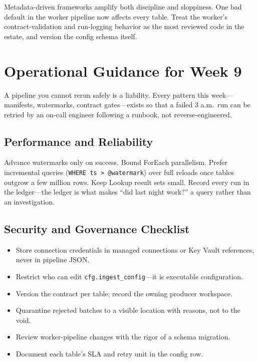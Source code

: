 \begin{pitfall}
Metadata-driven frameworks amplify both discipline and sloppiness. One bad default in the worker pipeline now affects every table. Treat the worker's contract-validation and run-logging behavior as the most reviewed code in the estate, and version the config schema itself.
\end{pitfall}

\section{Operational Guidance for Week 9}
A pipeline you cannot rerun safely is a liability. Every pattern this week---manifests, watermarks, contract gates---exists so that a failed 3 a.m.\ run can be retried by an on-call engineer following a runbook, not reverse-engineered.

\subsection{Performance and Reliability}
Advance watermarks only on success. Bound ForEach parallelism. Prefer incremental queries (\texttt{WHERE ts > @watermark}) over full reloads once tables outgrow a few million rows. Keep Lookup result sets small. Record every run in the ledger---the ledger is what makes ``did last night work?'' a query rather than an investigation.

\subsection{Security and Governance Checklist}
\begin{itemize}
    \item Store connection credentials in managed connections or Key Vault references, never in pipeline JSON.
    \item Restrict who can edit \texttt{cfg.ingest\_config}---it is executable configuration.
    \item Version the contract per table; record the owning producer workspace.
    \item Quarantine rejected batches to a visible location with reasons, not to the void.
    \item Review worker-pipeline changes with the rigor of a schema migration.
    \item Document each table's SLA and retry unit in the config row.
\end{itemize}

